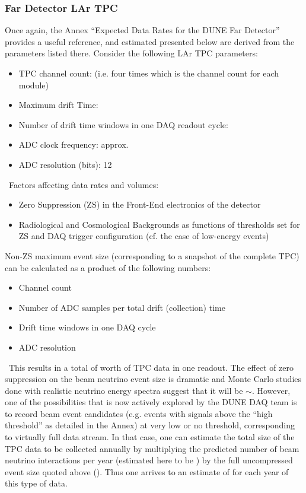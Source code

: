 \subsubsection{Far Detector LAr TPC}
Once again, the Annex ``Expected Data Rates for the DUNE Far Detector''
provides a useful reference, and estimated presented below are derived from
the parameters listed there. Consider the following LAr TPC parameters:
\begin{itemize}
\item TPC channel count: \dunenumberchannels (i.e. four times
  \daqchannelsperdetector which is the channel count for each \tpcdetectormass module)
\item Maximum drift Time: \tpcdrifttime
\item Number of drift time windows in one DAQ readout cycle: \daqdriftsperreadout
\item ADC clock frequency: approx. \daqsamplerate
\item ADC resolution (bits): 12
\end{itemize}
\
Factors affecting data rates and volumes:
\begin{itemize}
\item Zero Suppression (ZS)  in the Front-End electronics of the detector
\item Radiological and Cosmological Backgrounds as functions of thresholds set for ZS
and DAQ trigger configuration (cf. the case of low-energy events)
\end{itemize}

Non-ZS maximum event size (corresponding to a snapshot of the complete TPC) can be calculated as a product of the following numbers:
\begin{itemize}
\item Channel count
\item Number of ADC samples per total drift (collection) time
\item Drift time windows in one DAQ cycle
\item ADC resolution
\end{itemize}
\
This results in a total of \dunefsreadoutsize worth of TPC data in one
readout.
The effect of zero suppression on
the beam neutrino event size is dramatic and Monte Carlo studies done with realistic neutrino
energy spectra suggest that it will be $\sim$\beameventsize.
However, one of the possibilities that is
now actively explored by the DUNE DAQ team is to record beam event candidates (e.g. events with signals
above the ``high threshold'' as detailed in the Annex) at very low or no threshold, corresponding
to virtually full data stream.
In that case, one can estimate the total size of the TPC data
to be collected annually by multiplying the predicted number of beam neutrino interactions
per year (estimated here to be \beamrate) by the full uncompressed event size quoted above (\dunefsreadoutsize). 
Thus one arrives to an estimate of \beamdatayearfs for each year of this type of
data.

